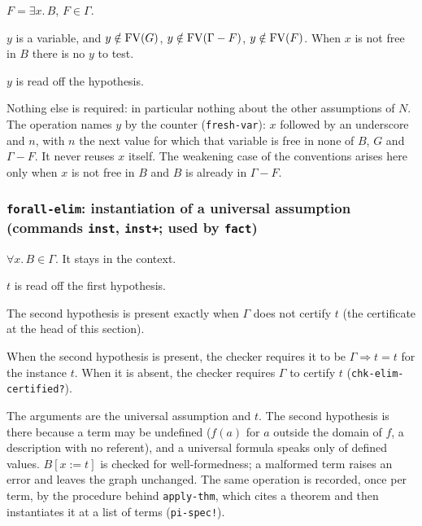\label{kop:forsome-elim}%
\begin{VNBcond}
\item[Assumption] $F = \exists x.\, B$, $F \in \Gamma$.
\item[Eigenvariable] $y$ is a variable, and $y \notin \mathrm{FV}(G)$,
  $y \notin \mathrm{FV}(\Gamma - F)$, $y \notin \mathrm{FV}(F)$.  When $x$ is not free
  in $B$ there is no $y$ to test.
\item[Matching] $y$ is read off the hypothesis.
\end{VNBcond}
Nothing else is required: in particular nothing about the other
assumptions of $N$.  The operation names $y$ by the counter
(\texttt{fresh-var}): $x$ followed by an underscore and $n$, with $n$ the
next value for which that variable is free in none of $B$, $G$ and
$\Gamma - F$.  It never reuses $x$ itself.  The weakening case of the
conventions arises here only when $x$ is not free in $B$ and $B$ is
already in $\Gamma - F$.

\subsubsection*{\texttt{forall-elim}: instantiation of a universal assumption
  (commands \texttt{inst}, \texttt{inst+}; used by \texttt{fact})}

\label{kop:forall-elim}%
\begin{VNBcond}
\item[Assumption] $\forall x.\, B \in \Gamma$.  It stays in the context.
\item[Matching] $t$ is read off the first hypothesis.
\item[Definedness] The second hypothesis is present exactly when
  $\Gamma$ does not certify $t$ (the certificate at the head of this
  section).
\item[Verified by] When the second hypothesis is present, the checker
  requires it to be $\Gamma \Longrightarrow t = t$ for the instance $t$.
  When it is absent, the checker requires $\Gamma$ to certify $t$
  (\texttt{chk-elim-certified?}).
\end{VNBcond}
The arguments are the universal assumption and $t$.  The second
hypothesis is there because a term may be undefined ($f(a)$ for $a$
outside the domain of $f$, a description with no referent), and a
universal formula speaks only of defined values.  $B[x{:=}t]$ is checked
for well-formedness; a malformed term raises an error and leaves the
graph unchanged.  The same operation is recorded, once per term, by the
procedure behind \texttt{apply-thm}, which cites a theorem and then
instantiates it at a list of terms (\texttt{pi-spec!}).

